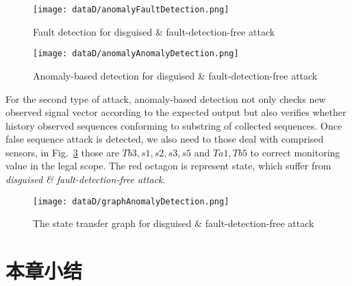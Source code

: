		\begin{figure}[!htb]
			\centering
			\texttt{[image: dataD/anomalyFaultDetection.png]}
			\caption{Fault detection for disguised \& fault-detection-free attack}
			\label{fig18}
		\end{figure}
		
		\begin{figure}[!htb]
			\centering
			\texttt{[image: dataD/anomalyAnomalyDetection.png]}
			\caption{Anomaly-based detection for disguised \& fault-detection-free attack}
			\label{fig19}
		\end{figure}
	
	For the second type of attack, anomaly-based detection not only checks new observed signal vector according to the expected output but also verifies whether history observed sequences conforming to substring of collected sequences. Once false sequence attack is detected, we also need to  those deal with comprised sensors, in 
	Fig.~\ref{fig20} those are $Tb3,s1,s2,s3,s5$ and $Ta1,Tb5$ to correct monitoring value in the legal scope. The red octagon is represent state, which suffer from \textit{disguised \& fault-detection-free attack}.
	
	\begin{figure}[!htb]
		\centering
		\texttt{[image: dataD/graphAnomalyDetection.png]}
		\caption{The state transfer graph for disguised \& fault-detection-free attack}
		\label{fig20}
	\end{figure}






\section{本章小结}
\label{sec:insertimage}


